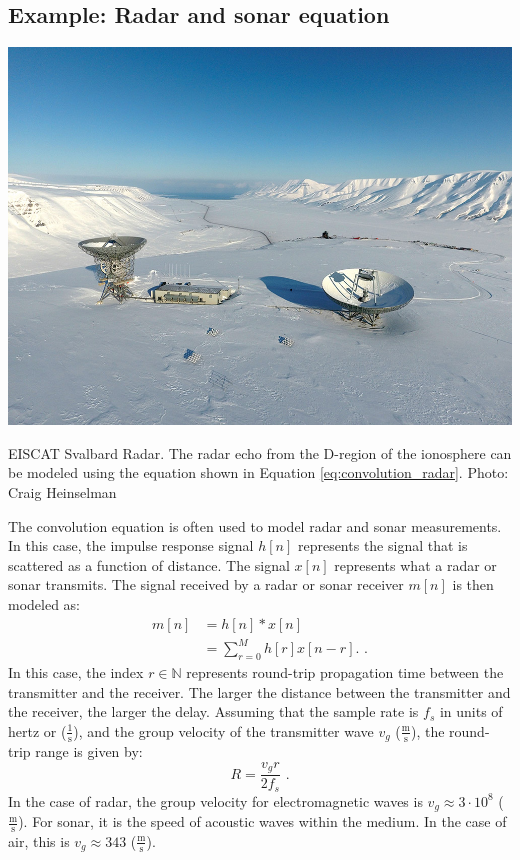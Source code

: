 \subsection{Example: Radar and sonar equation}

\begin{marginfigure}
\begin{center}
\includegraphics[width=\textwidth]{ch10/figures/svalbard.jpg}
\end{center}
\caption{EISCAT Svalbard Radar. The radar echo from the D-region of the ionosphere can be modeled using the equation shown in Equation \ref{eq:convolution_radar}. Photo: Craig Heinselman}
\label{fig:eiscat_svalbard}
\end{marginfigure}
The convolution equation is often used to model radar and sonar
measurements. In this case, the impulse response signal $h[n]$
represents the signal that is scattered as a function of distance. The
signal $x[n]$ represents what a radar or sonar transmits. The signal
received by a radar or sonar receiver $m[n]$ is then modeled as:
\begin{align}
m[n] &=  h[n]*x[n]\\
     &= \sum_{r=0}^{M} h[r] x[n-r]. \label{eq:convolution_radar}\,\,.
\end{align}
In this case, the index $r \in \mathbb{N}$ represents round-trip
propagation time between the transmitter and the receiver. The larger
the distance between the transmitter and the receiver, the larger the
delay. Assuming that the sample rate is $f_s$ in units of hertz or
($\frac{1}{\mathrm{s}}$), and the group velocity of the transmitter
wave $v_g$ ($\frac{\mathrm{m}}{\mathrm{s}}$), the round-trip range is given by:
\begin{equation}
R = \frac{v_g r}{2 f_s}\,\,.
\end{equation}
In the case of radar, the group velocity for electromagnetic waves is
$v_g \approx 3 \cdot 10^8$ ($\frac{\mathrm{m}}{\mathrm{s}}$). For sonar, it is the speed of
acoustic waves within the medium. In the case of air, this is
$v_g \approx 343$ ($\frac{\mathrm{m}}{\mathrm{s}}$).

